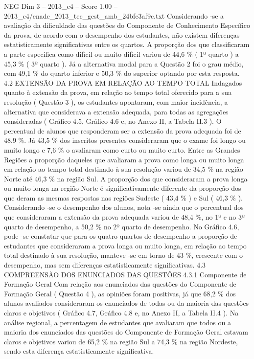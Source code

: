 \begin{textsample}{NEG Dim 3 – 2013\_c4 – Score 1.00 – 2013\_c4/enade\_2013\_tec\_gest\_amb\_24bfe3af9c.txt}
Considerando -se a avaliação da dificuldade das questões do Componente de Conhecimento Específico da prova, de acordo com o desempenho dos estudantes, não existem diferenças estatisticamente significativas entre os quartos.
A proporção dos que classificaram a parte específica como difícil ou muito difícil variou de 44,6 \% ( 1º quarto ) a 45,3 \% ( 3º quarto ).
Já a alternativa modal para a Questão 2 foi o grau médio, com 49,1 \% do quarto inferior e 50,3 \% do superior optando por esta resposta. 4.2 EXTENSÃO DA PROVA EM RELAÇÃO AO TEMPO TOTAL Indagados quanto à extensão da prova, em relação ao tempo total oferecido para a sua resolução ( Questão 3 ), os estudantes apontaram, com maior incidência, a alternativa que considerava a extensão adequada, para todas as agregações consideradas ( Gráfico 4.5, Gráfico 4.6 e, no Anexo II, a Tabela II.3 ).
O percentual de alunos que responderam ser a extensão da prova adequada foi de 48,9 \%.
Já 43,5 \% dos inscritos presentes consideraram que o exame foi longo ou muito longo e 7,6 \% o avaliaram como curto ou muito curto.
Entre as Grandes Regiões a proporção daqueles que avaliaram a prova como longa ou muito longa em relação ao tempo total destinado à sua resolução variou de 34,5 \% na região Norte até 46,3 \% na região Sul.
A proporção dos que consideraram a prova longa ou muito longa na região Norte é significativamente diferente da proporção dos que deram as mesmas respostas nas regiões Sudeste ( 43,4 \% ) e Sul ( 46,3 \% ).
Considerando -se o desempenho dos alunos, nota -se ainda que o percentual dos que consideraram a extensão da prova adequada variou de 48,4 \%, no 1º e no 3º quarto de desempenho, a 50,2 \% no 2º quarto de desempenho.
No Gráfico 4.6, pode -se constatar que para os quatro quartos de desempenho a proporção de estudantes que consideraram a prova longa ou muito longa, em relação ao tempo total destinado à sua resolução, manteve -se em torno de 43 \%, crescente com o desempenho, mas sem diferenças estatisticamente significativas. 4.3 COMPREENSÃO DOS ENUNCIADOS DAS QUESTÕES 4.3.1 Componente de Formação Geral Com relação aos enunciados das questões do Componente de Formação Geral ( Questão 4 ), as opiniões foram positivas, já que 68,2 \% dos alunos avaliados consideraram os enunciados de todas ou da maioria das questões claros e objetivos ( Gráfico 4.7, Gráfico 4.8 e, no Anexo II, a Tabela II.4 ).
Na análise regional, a percentagem de estudantes que avaliaram que todos ou a maioria dos enunciados das questões do Componente de Formação Geral estavam claros e objetivos variou de 65,2 \% na região Sul a 74,3 \% na região Nordeste, sendo esta diferença estatisticamente significativa.

\end{textsample}
